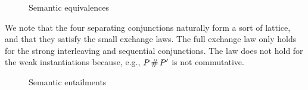 \documentclass[11pt]{article}
\begin{document}
\begin{figure}[ht]
	\centering
	\caption{\label{fig:equivalences}Semantic equivalences}
\end{figure}

We note that the four separating conjunctions naturally form a sort of lattice, and that they satisfy the small exchange laws. The full exchange law only holds for the strong interleaving and sequential conjunctions. The law does not hold for the weak instantiations because, e.g., $P \operatorname{\#} P'$ is not commutative. 

\begin{figure}[ht]
	\centering
	\caption{\label{fig:entailments}Semantic entailments}
\end{figure}
\end{document}
